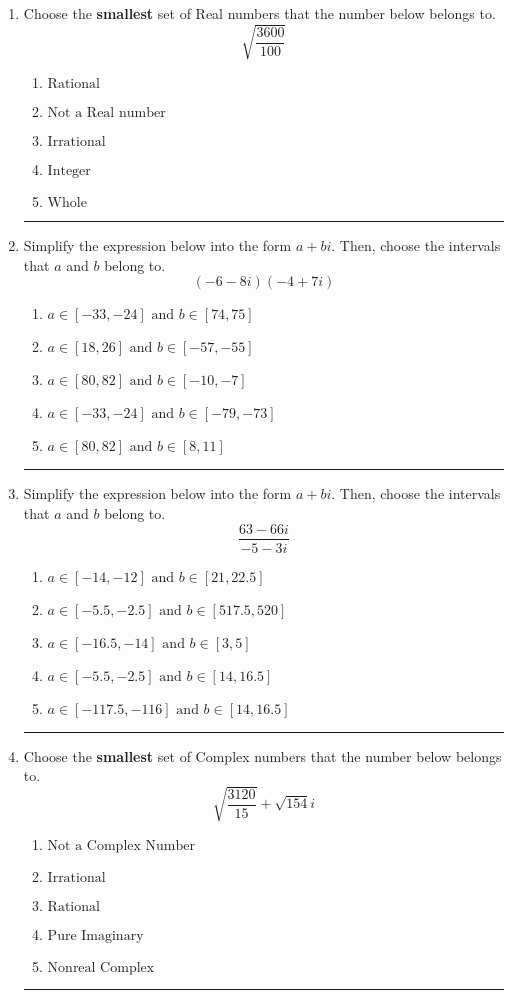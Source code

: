\documentclass[14pt]{extbook}
\newcommand{\litem}[1]{\item#1\hspace*{-1cm}\rule{\textwidth}{0.4pt}}
\begin{document}
\begin{enumerate}
\litem{
Choose the \textbf{smallest} set of Real numbers that the number below belongs to.\[ \sqrt{\frac{3600}{100}} \]\begin{enumerate}[label=\Alph*.]
\item \( \text{Rational} \)
\item \( \text{Not a Real number} \)
\item \( \text{Irrational} \)
\item \( \text{Integer} \)
\item \( \text{Whole} \)

\end{enumerate} }
\litem{
Simplify the expression below into the form $a+bi$. Then, choose the intervals that $a$ and $b$ belong to.\[ (-6 - 8 i)(-4 + 7 i) \]\begin{enumerate}[label=\Alph*.]
\item \( a \in [-33, -24] \text{ and } b \in [74, 75] \)
\item \( a \in [18, 26] \text{ and } b \in [-57, -55] \)
\item \( a \in [80, 82] \text{ and } b \in [-10, -7] \)
\item \( a \in [-33, -24] \text{ and } b \in [-79, -73] \)
\item \( a \in [80, 82] \text{ and } b \in [8, 11] \)

\end{enumerate} }
\litem{
Simplify the expression below into the form $a+bi$. Then, choose the intervals that $a$ and $b$ belong to.\[ \frac{63 - 66 i}{-5 - 3 i} \]\begin{enumerate}[label=\Alph*.]
\item \( a \in [-14, -12] \text{ and } b \in [21, 22.5] \)
\item \( a \in [-5.5, -2.5] \text{ and } b \in [517.5, 520] \)
\item \( a \in [-16.5, -14] \text{ and } b \in [3, 5] \)
\item \( a \in [-5.5, -2.5] \text{ and } b \in [14, 16.5] \)
\item \( a \in [-117.5, -116] \text{ and } b \in [14, 16.5] \)

\end{enumerate} }
\litem{
Choose the \textbf{smallest} set of Complex numbers that the number below belongs to.\[ \sqrt{\frac{3120}{15}}+\sqrt{154} i \]\begin{enumerate}[label=\Alph*.]
\item \( \text{Not a Complex Number} \)
\item \( \text{Irrational} \)
\item \( \text{Rational} \)
\item \( \text{Pure Imaginary} \)
\item \( \text{Nonreal Complex} \)


\end{enumerate}}
\end{enumerate}
\end{document}

